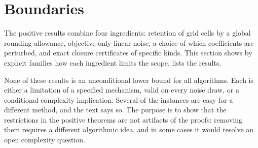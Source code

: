 \section{Boundaries}\label{sec:lim}

The positive results combine four ingredients: retention of grid cells by a
global rounding allowance, objective-only linear noise, a choice of which
coefficients are perturbed, and exact closure certificates of specific
kinds. This section shows by explicit families how each ingredient limits
the scope.  lists the results.

None of these results is an unconditional lower bound for all algorithms.
Each is either a limitation of a specified mechanism, valid on every noise
draw, or a conditional complexity implication. Several of the instances are
easy for a different method, and the text says so. The purpose is to show
that the restrictions in the positive theorems are not artifacts of the
proofs: removing them requires a different algorithmic idea, and in some
cases it would resolve an open complexity question.

